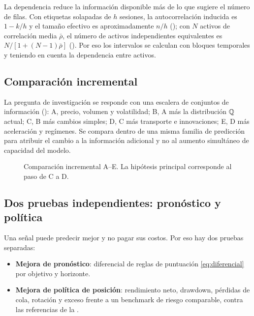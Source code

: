 La dependencia reduce la información disponible más de lo que sugiere el número de filas. Con etiquetas
solapadas de $h$ sesiones, la autocorrelación inducida es $1-k/h$ y el tamaño efectivo es
aproximadamente $n/h$ (); con $N$ activos de correlación media $\bar\rho$, el
número de activos independientes equivalentes es $N/[1+(N-1)\bar\rho]$ ().
Por eso los intervalos se calculan con bloques temporales y teniendo en cuenta la dependencia entre activos.



\subsection{Comparación incremental}\label{sec:incremental}

La pregunta de investigación se responde con una escalera de conjuntos de información
(): A, precio, volumen y volatilidad; B, A más la distribución $\mathbb{Q}$ actual; C, B
más cambios simples; D, C más transporte e innovaciones; E, D más aceleración y regímenes. Se compara
dentro de una misma familia de predicción para atribuir el cambio a la información adicional y no al
aumento simultáneo de capacidad del modelo.

\begin{figure}[H]
\centering
\resizebox{\linewidth}{!}{}
\caption{Comparación incremental A--E. La hipótesis principal corresponde al paso de C a D.}
\label{fig:incremental}
\end{figure}

\subsection{Dos pruebas independientes: pronóstico y política}\label{sec:dos_pruebas}

Una señal puede predecir mejor y no pagar sus costos. Por eso hay dos pruebas separadas:

\begin{itemize}
\item \textbf{Mejora de pronóstico}: diferencial de reglas de puntuación \eqref{eq:diferencial} por
objetivo y horizonte.
\item \textbf{Mejora de política de posición}: rendimiento neto, drawdown, pérdidas de cola, rotación y
exceso frente a un benchmark de riesgo comparable, contra las referencias de la .
\end{itemize}

